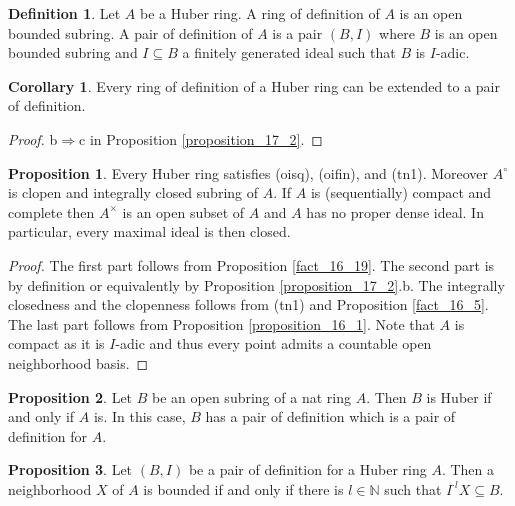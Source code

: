 \documentclass[10pt]{article}
\numberwithin{equation}{section}
\theoremstyle{definition}
\newtheorem{proposition}{Proposition}[subsection]
\newtheorem{definition}{Definition}[subsection]
\newtheorem{corollary}{Corollary} [subsection]
\newcommand{\N}[0]{\mathbb{N}}
\begin{document}
\begin{definition}
    \label{definition_17_3_b}
   Let $A$ be a Huber ring. A ring of definition of $A$ is an open bounded subring. A pair of definition of $A$ is a pair $(B,I)$ where $B$ is an open bounded subring and $I\subseteq B$ a finitely generated ideal such that $B$ is $I$-adic.
\end{definition}

\begin{corollary}
    Every ring of definition of a Huber ring can be extended to a pair of definition.
\end{corollary}
\begin{proof}
    b$\Rightarrow$c in Proposition \ref{proposition_17_2}.
\end{proof}

\begin{proposition}
    \label{fact_17_7}
    Every Huber ring satisfies (oisq), (oifin), and (tn1).
    Moreover $A^\circ$ is clopen and integrally closed subring of $A$.
    If $A$ is (sequentially) compact and complete
    then $A^\times$ is an open subset of $A$ and $A$ has no proper dense ideal. In particular, every maximal ideal is then closed.
\end{proposition}
\begin{proof}
    The first part follows from Proposition \ref{fact_16_19}. The second part is by definition or equivalently by Proposition \ref{proposition_17_2}.b.
    The integrally closedness and the clopenness follows from (tn1) and Proposition \ref{fact_16_5}. The last part follows from Proposition \ref{proposition_16_1}. Note that $A$ is compact as it is $I$-adic and thus every point admits a countable open neighborhood basis.
\end{proof}

\begin{proposition}
    \label{fact_17_8}
    Let $B$ be an open subring of a nat ring $A$. Then $B$ is Huber if and only if $A$ is. In this case, $B$ has a pair of definition which is a pair of definition for $A$.
\end{proposition}

\begin{proposition}
    \label{fact_17_9}
    Let $(B,I)$ be a pair of definition for a Huber ring $A$. Then a neighborhood $X$ of $A$ is bounded if and only if there is $l\in\N$ such that $I^{\cdot l}X\subseteq B$.
\end{proposition}
\end{document}
